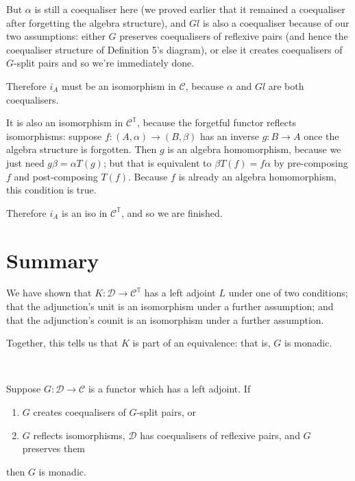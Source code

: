 \documentclass[11pt]{amsart}
\begin{document}
But $\alpha$ is still a coequaliser here (we proved earlier that it remained a coequaliser after forgetting the algebra structure), and $Gl$ is also a coequaliser because of our two assumptions: either $G$ preserves coequalisers of reflexive pairs (and hence the coequaliser structure of Definition 5's diagram), or else it creates coequalisers of $G$-split pairs and so we're immediately done.

Therefore $i_A$ must be an isomorphism in $\mathcal{C}$, because $\alpha$ and $Gl$ are both coequalisers.

It is also an isomorphism in $\mathcal{C}^{\mathbb{T}}$, because the forgetful functor reflects isomorphisms: suppose $f: (A, \alpha) \to (B, \beta)$ has an inverse $g: B \to A$ once the algebra structure is forgotten.
Then $g$ is an algebra homomorphism, because we just need $g \beta = \alpha T(g)$; but that is equivalent to $\beta T(f) = f \alpha$ by pre-composing $f$ and post-composing $T(f)$.
Because $f$ is already an algebra homomorphism, this condition is true.

Therefore $i_A$ is an iso in $\mathcal{C}^{\mathbb{T}}$, and so we are finished.

\section{Summary}

We have shown that $K: \mathcal{D} \to \mathcal{C}^{\mathbb{T}}$ has a left adjoint $L$ under one of two conditions;
that the adjunction's unit is an isomorphism under a further assumption;
and that the adjunction's counit is an isomorphism under a further assumption.

Together, this tells us that $K$ is part of an equivalence: that is, $G$ is monadic.

\

\begin{thm}
Suppose $G: \mathcal{D} \to \mathcal{C}$ is a functor which has a left adjoint. If 
\begin{enumerate}
\item $G$ creates coequalisers of $G$-split pairs, or
\item $G$ reflects isomorphisms, $\mathcal{D}$ has coequalisers of reflexive pairs, and $G$ preserves them 
\end{enumerate}
then $G$ is monadic.
\end{thm}
\end{document}
